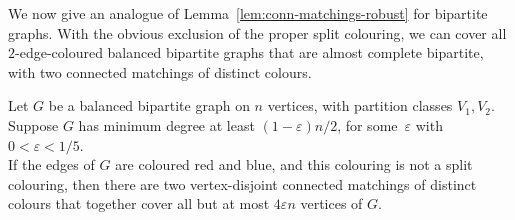 \documentclass[a4paper,10pt]{article}
\let\eps\varepsilon
\begin{document}
We now give an analogue of Lemma~\ref{lem:conn-matchings-robust} for bipartite graphs. With the obvious exclusion of the proper split colouring, we can cover all $2$-edge-coloured balanced bipartite graphs that are almost complete bipartite, with two connected matchings of distinct colours.

\begin{lemma}\label{lem:conn-matchings-robust-for-bip}
Let $G$ be a balanced bipartite graph on $n$ vertices, with partition classes $V_1,V_2$.  Suppose $G$ has minimum degree at least $(1-\eps)n/2$,  for some~$\eps$ with $0<\varepsilon <1/5$.\\ If  the
edges of $G$ are coloured red and blue, and this colouring is not a split colouring,
then there are two vertex-disjoint connected matchings of distinct colours that together cover all but at most $4\varepsilon n$ vertices of $G$.
\end{lemma}
\end{document}
